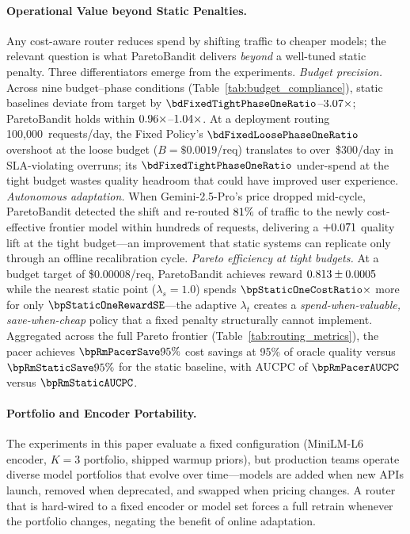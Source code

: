 \paragraph{Operational Value beyond Static Penalties.}
Any cost-aware router reduces spend by shifting traffic to cheaper models; the relevant question is what ParetoBandit delivers \emph{beyond} a well-tuned static penalty.  Three differentiators emerge from the experiments.
%
\emph{Budget precision.}
Across nine budget--phase conditions (Table~\ref{tab:budget_compliance}), static baselines deviate from target by $\bdFixedTightPhaseOneRatio$--$3.07\times$; ParetoBandit holds within $0.96\times$--$1.04\times$.
At a deployment routing 100{,}000~requests/day, the Fixed Policy's $\bdFixedLoosePhaseOneRatio$ overshoot at the loose budget ($B{=}\$0.0019$/req) translates to over~\$300/day in SLA-violating overruns; its $\bdFixedTightPhaseOneRatio$ under-spend at the tight budget wastes quality headroom that could have improved user experience.
%
\emph{Autonomous adaptation.}
When Gemini-2.5-Pro's price dropped mid-cycle, ParetoBandit detected the shift and re-routed $81\%$ of traffic to the newly cost-effective frontier model within hundreds of requests, delivering a $+0.071$ quality lift at the tight budget---an improvement that static systems can replicate only through an offline recalibration cycle.
%
\emph{Pareto efficiency at tight budgets.}
At a budget target of \$0.00008/req, ParetoBandit achieves reward $0.813 \pm 0.0005$ while the nearest static point ($\lambda_s{=}1.0$) spends $\bpStaticOneCostRatio\times$ more for only $\bpStaticOneRewardSE$---the adaptive $\lambda_t$ creates a \emph{spend-when-valuable, save-when-cheap} policy that a fixed penalty structurally cannot implement.
Aggregated across the full Pareto frontier (Table~\ref{tab:routing_metrics}), the pacer achieves $\bpRmPacerSave95\%$ cost savings at 95\% of oracle quality versus $\bpRmStaticSave95\%$ for the static baseline, with AUCPC of $\bpRmPacerAUCPC$ versus $\bpRmStaticAUCPC$.

\paragraph{Portfolio and Encoder Portability.}
The experiments in this paper evaluate a fixed configuration (MiniLM-L6 encoder, $K{=}3$ portfolio, shipped warmup priors), but production teams operate diverse model portfolios that evolve over time---models are added when new APIs launch, removed when deprecated, and swapped when pricing changes.
A router that is hard-wired to a fixed encoder or model set forces a full retrain whenever the portfolio changes, negating the benefit of online adaptation.

